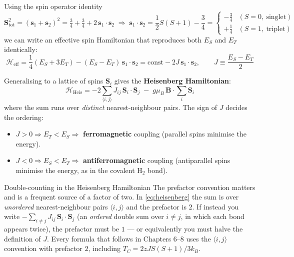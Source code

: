 \documentclass[11pt,a4paper]{article}
\newcommand{\vb}[1]{\mathbf{#1}}
\begin{document}
Using the spin operator identity
\begin{equation}
    \vb{S}_{\mathrm{tot}}^2 = (\vb{s}_1+\vb{s}_2)^2
    = \tfrac34+\tfrac34+2\,\vb{s}_1\cdot\vb{s}_2
    \;\Longrightarrow\;
    \vb{s}_1\cdot\vb{s}_2 = \frac{1}{2}S(S+1)-\frac34
    = \begin{cases}-\tfrac34 & (S=0,\ \text{singlet})\\[2pt] +\tfrac14 & (S=1,\ \text{triplet})\end{cases}
    \label{eq:spinidentity}
\end{equation}
we can write an effective spin Hamiltonian that reproduces both $E_S$ and $E_T$ identically:
\begin{equation}
    \mathcal{H}_{\mathrm{eff}} = \frac{1}{4}(E_S+3E_T) - (E_S-E_T)\,\vb{s}_1\cdot\vb{s}_2
    = \text{const} - 2J\,\vb{s}_1\cdot\vb{s}_2,
    \qquad J \equiv \frac{E_S - E_T}{2}
    \label{eq:Heis2}
\end{equation}

Generalising to a lattice of spins $\vb{S}_i$ gives the \textbf{Heisenberg Hamiltonian}:
\begin{equation}
    \boxed{\;\mathcal{H}_{\mathrm{Heis}} = -2\sum_{\langle i,j\rangle}J_{ij}\,\vb{S}_i\cdot\vb{S}_j
    \;-\; g\mu_B\,\vb{B}\cdot\sum_i\vb{S}_i\;}
    \label{eq:heisenberg}
\end{equation}
where the sum runs over \emph{distinct} nearest-neighbour pairs. The sign of $J$ decides the ordering:
\begin{itemize}[leftmargin=1.6cm]
    \item $J>0 \Rightarrow E_T < E_S \Rightarrow$ \textbf{ferromagnetic} coupling (parallel spins minimise the energy).
    \item $J<0 \Rightarrow E_S < E_T \Rightarrow$ \textbf{antiferromagnetic} coupling (antiparallel spins minimise the energy, as in the covalent $\text{H}_2$ bond).
\end{itemize}

\begin{pitfallbox}{Double-counting in the Heisenberg Hamiltonian}
The prefactor convention matters and is a frequent source of a factor of two. In \eqref{eq:heisenberg} the sum is over \emph{unordered} nearest-neighbour pairs $\langle i,j\rangle$ and the prefactor is $2$. If instead you write $-\sum_{i\neq j}J_{ij}\,\vb{S}_i\cdot\vb{S}_j$ (an \emph{ordered} double sum over $i\neq j$, in which each bond appears twice), the prefactor must be $1$ --- or equivalently you must halve the definition of $J$. Every formula that follows in Chapters 6--8 uses the $\langle i,j\rangle$ convention with prefactor $2$, including $T_C = 2zJS(S+1)/3k_B$.
\end{pitfallbox}
\end{document}
